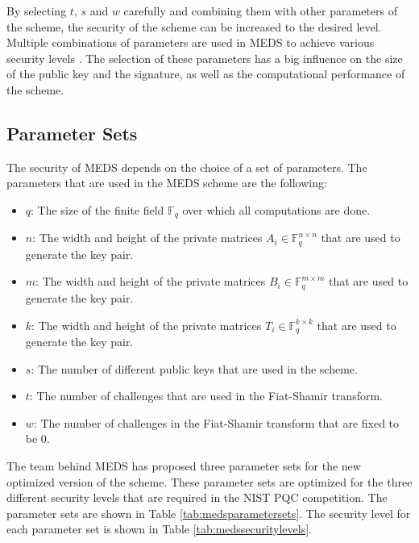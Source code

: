 \documentclass[11pt,a4paper]{report}
\begin{document}
By selecting $t$, $s$ and $w$ carefully and combining them with other parameters of the scheme, the security of the scheme can be increased to the desired level. Multiple combinations of parameters are used in MEDS to achieve various security levels \cite{chou2023meds}. The selection of these parameters has a big influence on the size of the public key and the signature, as well as the computational performance of the scheme.

\subsection{Parameter Sets}
The security of MEDS depends on the choice of a set of parameters. The parameters that are used in the MEDS scheme are the following:
\begin{itemize}
  \item $q$: The size of the finite field $\mathbb{F}_q$ over which all computations are done.
  \item $n$: The width and height of the private matrices $A_i \in \mathbb{F}_q^{n \times n}$ that are used to generate the key pair.
  \item $m$: The width and height of the private matrices $B_i \in \mathbb{F}_q^{m \times m}$ that are used to generate the key pair.
  \item $k$: The width and height of the private matrices $T_i \in \mathbb{F}_q^{k \times k}$ that are used to generate the key pair.
  \item $s$: The number of different public keys that are used in the scheme.
  \item $t$: The number of challenges that are used in the Fiat-Shamir transform.
  \item $w$: The number of challenges in the Fiat-Shamir transform that are fixed to be 0.
\end{itemize}

The team behind MEDS has proposed three parameter sets for the new optimized version of the scheme. These parameter sets are optimized for the three different security levels that are required in the NIST PQC competition. The parameter sets are shown in Table \ref{tab:medsparametersets}. The security level for each parameter set is shown in Table \ref{tab:medssecuritylevels}.
\end{document}
